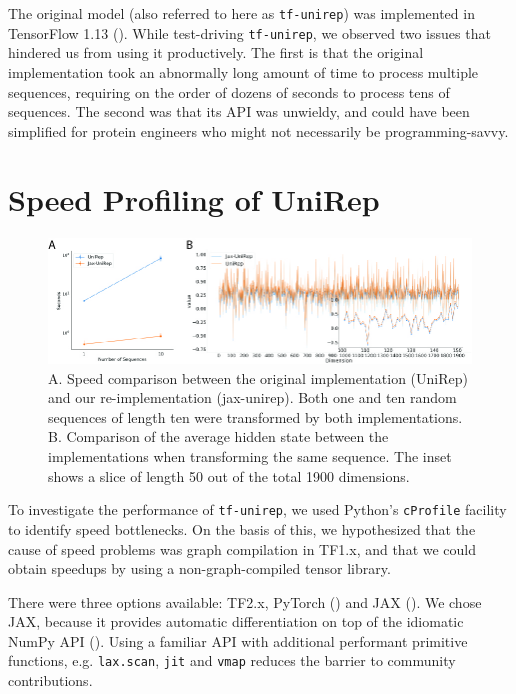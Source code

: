 \documentclass{bioinfo}
\begin{document}
The original model (also referred to here as \verb|tf-unirep|)
was implemented in TensorFlow 1.13 (\cite{abadi2016tensorflow}).
While test-driving \verb|tf-unirep|, we observed two issues
that hindered us from using it productively.
The first is that the original implementation
took an abnormally long amount of time to process multiple sequences,
requiring on the order of dozens of seconds to process tens of sequences.
The second was that its API was unwieldy,
and could have been simplified for protein engineers
who might not necessarily be programming-savvy.

\section{Speed Profiling of UniRep}

\begin{figure}[!tpb]
    \centerline{\includegraphics[width=6in]{fig01.jpg}}
    \caption{
        A. Speed comparison between the original implementation (UniRep)
        and our re-implementation (jax-unirep).
        Both one and ten random sequences of length ten
        were transformed by both implementations.
        B. Comparison of the average hidden state between the implementations
        when transforming the same sequence.
        The inset shows a slice of length 50 out of the total 1900 dimensions.
    }
    \label{fig:01}
\end{figure}

To investigate the performance of \verb|tf-unirep|,
we used Python's \verb|cProfile| facility to identify speed bottlenecks.
On the basis of this, we hypothesized that the cause of speed problems
was graph compilation in TF1.x,
and that we could obtain speedups by using 
a non-graph-compiled tensor library.

There were three options available: TF2.x, PyTorch (\cite{pytorch})
and JAX (\cite{jax2018github}).
We chose JAX, because it provides automatic differentiation
on top of the idiomatic NumPy API (\cite{oliphant2006guide}).
Using a familiar API with additional performant primitive functions,
e.g. \verb|lax.scan|, \verb|jit| and \verb|vmap|
reduces the barrier to community contributions.
\end{document}

